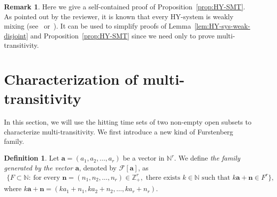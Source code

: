 \documentclass[12pt,a4paper]{amsart}
\theoremstyle{definition}
\newtheorem{de}[thm]{Definition}
\newtheorem{rem}[thm]{Remark}
\numberwithin{equation}{section}
\begin{document}
\begin{rem}
Here we give a self-contained proof of Proposition~\ref{prop:HY-SMT}.
As pointed out by the reviewer,
it is known that every HY-system is weakly mixing (see~\cite{W-Huang-X-Ye-2005} or~\cite{O10}).
It can be used to simplify proofs of Lemma~\ref{lem:HY-sys-weak-disjoint} and Proposition~\ref{prop:HY-SMT}
since we need only to prove multi-transitivity.
\end{rem}

\section{Characterization of multi-transitivity}
In this section, we will use the hitting time sets of two non-empty open subsets to characterize multi-transitivity.
We first introduce a new kind of Furstenberg family.
\begin{de}
Let $\mathbf{a}=(a_1,a_2,\dotsc,a_r)$ be a vector in $\mathbb{N}^r$.
We define \emph{the family generated by the vector $\mathbf{a}$},
denoted by $\mathcal{F}[\mathbf{a}]$, as
\begin{align*}
\{F\subset\mathbb{N}:\ \text{for every } \mathbf{n}=(n_1,n_2,\dotsc,n_r)\in\mathbb{Z}_+^r,
\text{ there exists }k\in\mathbb{N} \text{ such that }  k\mathbf{a}+\mathbf{n}\in F^r\},
\end{align*}
where $k\mathbf{a}+\mathbf{n}=(ka_1+n_1,ka_2+n_2,\dotsc,ka_r+n_r)$.
\end{de}
\end{document}
